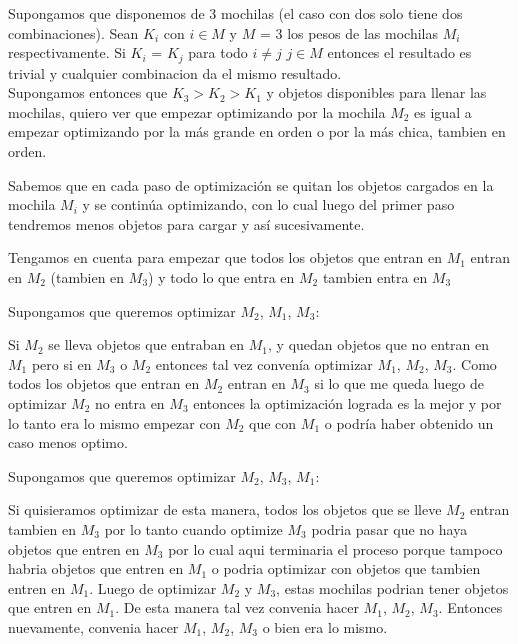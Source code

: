 Supongamos que disponemos de 3 mochilas (el caso con dos solo tiene dos combinaciones). 
Sean $K_i$ con $i \in M$ y $M$ = 3 los pesos de las mochilas $M_i$ respectivamente. Si $K_i$ = $K_j$ para todo $i \neq j$ $j \in M$ entonces el resultado es trivial y cualquier combinacion da el mismo resultado. \\

Supongamos entonces que $K_3 > K_2 > K_1$ y objetos disponibles para llenar las mochilas, quiero ver que empezar optimizando por la mochila $M_2$ es igual a empezar optimizando por la más grande en orden o por la más chica, tambien en orden. 

Sabemos que en cada paso de optimización se quitan los objetos cargados en la mochila $M_i$ y se continúa optimizando, con lo cual luego del primer paso tendremos menos objetos para cargar y así sucesivamente.

Tengamos en cuenta para empezar que todos los objetos que entran en $M_1$ entran en $M_2$ (tambien en $M_3$) y todo lo que entra en $M_2$ tambien entra en $M_3$ 

Supongamos que queremos optimizar $M_2$, $M_1$, $M_3$:

Si $M_2$ se lleva objetos que entraban en $M_1$, y quedan objetos que no entran en $M_1$ pero si en $M_3$ o $M_2$ entonces tal vez convenía optimizar $M_1$, $M_2$, $M_3$. Como todos los objetos que entran en $M_2$ entran en $M_3$ si lo que me queda luego de optimizar $M_2$ no entra en $M_3$ entonces la optimización lograda es la mejor y por lo tanto era lo mismo empezar con $M_2$ que con $M_1$ o podría haber obtenido un caso menos optimo.

Supongamos que queremos optimizar $M_2$, $M_3$, $M_1$: 

Si quisieramos optimizar de esta manera, todos los objetos que se lleve $M_2$ entran tambien en $M_3$ por lo tanto cuando optimize $M_3$ podria pasar que no haya objetos que entren en $M_3$ por lo cual aqui terminaria el proceso porque tampoco habria objetos que entren en $M_1$ o podria optimizar con objetos que tambien entren en $M_1$. Luego de optimizar $M_2$ y $M_3$, estas mochilas podrian tener objetos que entren en $M_1$. De esta manera tal vez convenia hacer $M_1$, $M_2$, $M_3$.
Entonces nuevamente, convenia hacer $M_1$, $M_2$, $M_3$ o bien era lo mismo. 

